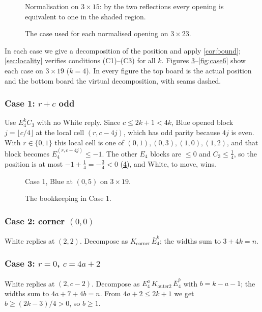 \documentclass[11pt]{amsart}
\theoremstyle{definition}
\newcommand{\Ebar}{\bar E_4}
\newcommand{\Kc}{K_{\mathrm{corner}}}
\newcommand{\Ktwo}{K_{\mathrm{outer2}}}
\begin{document}
\begin{figure}[ht]
\centering
{}
\caption{Normalisation on $3\times15$: by the two reflections every opening
is equivalent to one in the shaded region.}
\label{fig:norm}
\end{figure}

\begin{figure}[ht]
\centering
{}
\caption{The case used for each normalised opening on $3\times23$.}
\label{fig:casemap}
\end{figure}

In each case we give a decomposition of the position and apply
\cref{cor:bound}; \cref{sec:locality} verifies conditions (C1)--(C3) for all
$k$. Figures \ref{fig:case1}--\ref{fig:case6} show each case on $3\times19$
($k=4$). In every figure the top board is the actual position and the bottom
board the virtual decomposition, with seams dashed.

\subsubsection*{Case 1: $r+c$ odd}
Use $E_4^kC_3$ with no White reply. Since $c\le2k+1<4k$, Blue opened block
$j=\lfloor c/4\rfloor$ at the local cell $(r,c-4j)$, which has odd parity
because $4j$ is even. With $r\in\{0,1\}$ this local cell is one of
$(0,1),(0,3),(1,0),(1,2)$, and that block becomes $E_4^{(r,c-4j)}\le-1$. The
other $E_4$ blocks are $\le0$ and $C_3\le\frac14$, so the position is at most
$-1+\frac14=-\frac34<0$ (\cref{fig:numberline}), and White, to move, wins.

\begin{figure}[ht]
\centering
{}
\caption{Case 1, Blue at $(0,5)$ on $3\times19$.}
\label{fig:case1}
\end{figure}

\begin{figure}[ht]
\centering
{}
\caption{The bookkeeping in Case 1.}
\label{fig:numberline}
\end{figure}

\subsubsection*{Case 2: corner $(0,0)$}
White replies at $(2,2)$. Decompose as $\Kc\,\Ebar^k$; the widths sum to
$3+4k=n$.

\subsubsection*{Case 3: $r=0$, $c=4a+2$}
White replies at $(2,c-2)$. Decompose as $E_4^a\,\Ktwo\,\Ebar^b$ with
$b=k-a-1$; the widths sum to $4a+7+4b=n$. From $4a+2\le2k+1$ we get
$b\ge(2k-3)/4>0$, so $b\ge1$.
\end{document}
